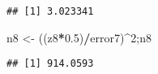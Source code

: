 \documentclass[
]{article}
\newenvironment{Shaded}{\begin{snugshade}}{\end{snugshade}}
\newcommand{\DecValTok}[1]{\textcolor[rgb]{0.00,0.00,0.81}{#1}}
\newcommand{\FloatTok}[1]{\textcolor[rgb]{0.00,0.00,0.81}{#1}}
\newcommand{\NormalTok}[1]{#1}
\newcommand{\OtherTok}[1]{\textcolor[rgb]{0.56,0.35,0.01}{#1}}
\newcommand{\SpecialCharTok}[1]{\textcolor[rgb]{0.81,0.36,0.00}{\textbf{#1}}}
\begin{document}
\begin{verbatim}
## [1] 3.023341
\end{verbatim}

\begin{Shaded}
\begin{Highlighting}[]
\NormalTok{n8 }\OtherTok{\textless{}{-}}\NormalTok{ ((z8}\SpecialCharTok{*}\FloatTok{0.5}\NormalTok{)}\SpecialCharTok{/}\NormalTok{error7)}\SpecialCharTok{\^{}}\DecValTok{2}\NormalTok{;n8}
\end{Highlighting}
\end{Shaded}

\begin{verbatim}
## [1] 914.0593
\end{verbatim}

\begin{Shaded}
\begin{Highlighting}[]

\end{Highlighting}
\end{Shaded}
\end{document}

